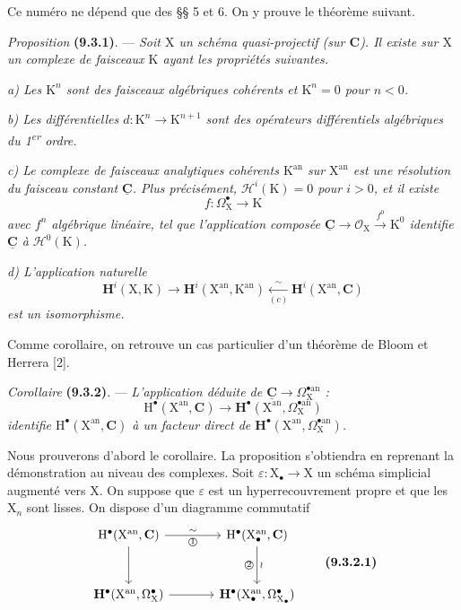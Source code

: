 \documentclass[11pt,leqno]{article}
\begin{document}
Ce numéro ne dépend que des §§ 5 et 6. On y prouve le théorème suivant.

\textit{Proposition} \textbf{(9.3.1)}. — \textit{Soit \(\mathrm{X}\) un schéma quasi-projectif (sur \(\mathbf{C}\)). Il existe sur \(\mathrm{X}\) un complexe de faisceaux \(\mathrm{K}\) ayant les propriétés suivantes.}

\textit{a) Les \(\mathrm{K}^{n}\) sont des faisceaux algébriques cohérents et \(\mathrm{K}^{n}=0\) pour \(n<0\).}

\textit{b) Les différentielles \(d:\mathrm{K}^{n}\to\mathrm{K}^{n+1}\) sont des opérateurs différentiels algébriques du 1\textsuperscript{er} ordre.}

\textit{c) Le complexe de faisceaux analytiques cohérents \(\mathrm{K}^{\mathrm{an}}\) sur \(\mathrm{X}^{\mathrm{an}}\) est une résolution du faisceau constant \(\underline{\mathbf{C}}\). Plus précisément, \(\mathscr{H}^{i}(\mathrm{K})=0\) pour \(i>0\), et il existe}
\[
f:\Omega_{\mathrm{X}}^{\bullet}\to\mathrm{K}
\]
\textit{avec \(f^{n}\) algébrique linéaire, tel que l’application composée \(\underline{\mathbf{C}}\to\mathscr{O}_{\mathrm{X}}\xrightarrow{f^{0}}\mathrm{K}^{0}\) identifie \(\underline{\mathbf{C}}\) à \(\mathscr{H}^{0}(\mathrm{K})\).}

\textit{d) L’application naturelle}
\[
\mathbf{H}^{i}(\mathrm{X},\mathrm{K})
\to\mathbf{H}^{i}(\mathrm{X}^{\mathrm{an}},\mathrm{K}^{\mathrm{an}})
\xleftarrow[(c)]{\sim}
\mathbf{H}^{i}(\mathrm{X}^{\mathrm{an}},\mathbf{C})
\]
\textit{est un isomorphisme.}

Comme corollaire, on retrouve un cas particulier d’un théorème de Bloom et Herrera [2].

\textit{Corollaire} \textbf{(9.3.2)}. — \textit{L’application déduite de \(\underline{\mathbf{C}}\to\Omega_{\mathrm{X}}^{\bullet\mathrm{an}}\) :}
\[
\mathrm{H}^{\bullet}(\mathrm{X}^{\mathrm{an}},\mathbf{C})
\to\mathbf{H}^{\bullet}(\mathrm{X}^{\mathrm{an}},\Omega_{\mathrm{X}}^{\bullet\mathrm{an}})
\]
\textit{identifie \(\mathrm{H}^{\bullet}(\mathrm{X}^{\mathrm{an}},\mathbf{C})\) à un facteur direct de \(\mathbf{H}^{\bullet}(\mathrm{X}^{\mathrm{an}},\Omega_{\mathrm{X}}^{\bullet\mathrm{an}})\).}

Nous prouverons d’abord le corollaire. La proposition s’obtiendra en reprenant la démonstration au niveau des complexes. Soit \(\varepsilon:\mathrm{X}_{\bullet}\to\mathrm{X}\) un schéma simplicial augmenté vers \(\mathrm{X}\). On suppose que \(\varepsilon\) est un hyperrecouvrement propre et que les \(\mathrm{X}_{n}\) sont lisses. On dispose d’un diagramme commutatif
\[
\begin{tikzcd}[ampersand replacement=\&, column sep=large, row sep=3em]
\mathrm{H}^{\bullet}(\mathrm{X}^{\mathrm{an}},\mathbf{C})
  \arrow[r, "\sim", "\text{\textcircled{1}}"']
  \arrow[d]
\&
\mathrm{H}^{\bullet}(\mathrm{X}_{\bullet}^{\mathrm{an}},\mathbf{C})
  \arrow[d, "\wr", "\text{\textcircled{2}}"']
\\
\mathbf{H}^{\bullet}(\mathrm{X}^{\mathrm{an}},\Omega_{\mathrm{X}}^{\bullet})
  \arrow[r]
\&
\mathbf{H}^{\bullet}(\mathrm{X}_{\bullet}^{\mathrm{an}},\Omega_{\mathrm{X}_{\bullet}}^{\bullet})
\end{tikzcd}
\tag*{\textbf{(9.3.2.1)}}
\]
\end{document}
